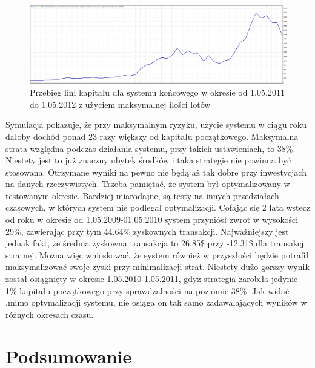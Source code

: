 \documentclass[pdflatex,11pt]{aghdpl}
\begin{document}
\begin{figure}[h!]
\begin{center}
\includegraphics[width=16cm]{wszystkie/linia_kap_max.png}
\caption{Przebieg lini kapitału dla systemu końcowego w okresie od 1.05.2011 do 1.05.2012 z użyciem maksymalnej ilości lotów}
\label{linia_kap_max}
\end{center}
\end{figure}
Symulacja pokazuje, że przy maksymalnym ryzyku, użycie systemu w ciągu roku dałoby dochód ponad 23 razy większy od kapitału początkowego. Maksymalna strata względna podczas działania systemu, przy takich ustawieniach, to 38\%. Niestety jest to już znaczny ubytek środków i taka strategie nie powinna być stosowana. Otrzymane wyniki na pewno nie będą aż tak dobre przy inwestycjach na danych rzeczywistych. Trzeba pamiętać, że system był optymalizowany w testowanym okresie. Bardziej miarodajne, są testy na innych przedziałach czasowych, w których system nie podlegał optymalizacji. Cofając się 2 lata wstecz od roku w okresie od 1.05.2009-01.05.2010 system przyniósł zwrot w wysokości 29\%, zawierając przy tym 44.64\% zyskownych transakcji. Najważniejszy jest jednak fakt, że średnia zyskowna transakcja to 26.85\$ przy -12.31\$ dla transakcji stratnej. Można więc wnioskować, że system również w przyszłości będzie potrafił maksymalizować swoje zyski przy minimalizacji strat. Niestety dużo gorszy wynik został osiągnięty w okresie 1.05.2010-1.05.2011, gdyż strategia zarobiła jedynie 1\% kapitału początkowego przy sprawdzalności na poziomie 38\%. Jak widać ,mimo optymalizacji systemu, nie osiąga on tak samo zadawalających wyników w różnych okresach czasu.
\chapter{Podsumowanie}
\end{document}
